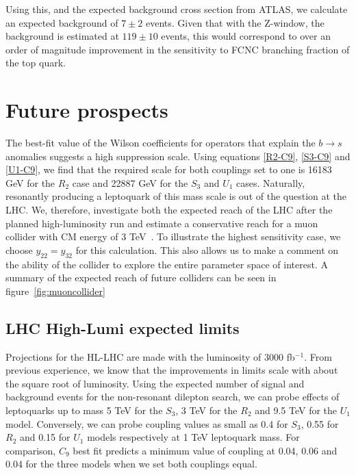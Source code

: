 \documentclass[12pt]{revtex4-2}
\numberwithin{equation}{section}
\begin{document}
 Using this, and the expected background cross section from ATLAS, we calculate an expected background of $7 \pm 2$ events.  Given that with the Z-window, the background is estimated at $119 \pm 10$ events, this would correspond to over an order of magnitude improvement in the sensitivity to FCNC branching fraction of the top quark. 

\section{Future prospects}
\label{sec:future}

The best-fit value of the Wilson coefficients for operators that explain the $b\rightarrow s$ anomalies suggests a high suppression scale.  Using equations \eqref{R2-C9}, \eqref{S3-C9} and \eqref{U1-C9}, we find that the required scale for both couplings set to one is 16183 GeV for the $R_2$ case and 22887 GeV for the  $S_3$ and $U_1$ cases.  Naturally, resonantly producing a leptoquark of this mass scale is out of the question at the LHC.  We, therefore, investigate both the expected reach of the LHC after the planned high-luminosity run and estimate a conservative reach for a muon collider with CM energy of 3 TeV~\cite{Palmer:1996gs, Palmer:2014nza, Ankenbrandt:1999cta, Gallardo:1996aa}.  To illustrate the highest sensitivity case, we choose $y_{22} = y_{32}$ for this calculation.  This also allows us to make a comment on the ability of the collider to explore the entire parameter space of interest.  A summary of the expected reach of future colliders can be seen in figure~\ref{fig:muoncollider}





\subsection{LHC High-Lumi expected limits}

Projections for the HL-LHC are made with the luminosity of $3000$ fb$^{-1}$.  From previous experience, we know that the improvements in limits scale with about the square root of luminosity.  Using the expected number of signal and background events for the non-resonant dilepton search,  we can probe effects of leptoquarks up to mass 5 TeV for the $S_3$, 3 TeV for the $R_2$ and 9.5 TeV for the $U_1$ model.  Conversely, we can probe coupling values as small as 0.4 for $S_3$, 0.55 for $R_2$ and 0.15 for $U_1$ models respectively at 1 TeV leptoquark mass.  For comparison, $C_9$ best fit predicts a minimum value of coupling at  0.04, 0.06 and 0.04 for the three models when we set both couplings equal.
\end{document}
